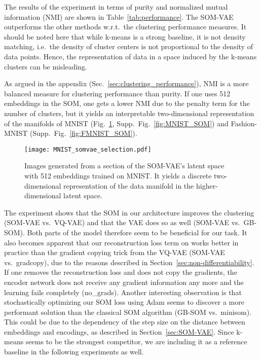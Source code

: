 \documentclass{article}
\begin{document}
The results of the experiment in terms of purity and normalized mutual information (NMI) are shown in Table~\ref{tab:performance}.
The SOM-VAE outperforms the other methods w.r.t.\ the clustering performance measures.
It should be noted here that while k-means is a strong baseline, it is not density matching, i.e.\ the density of cluster centers is not proportional to the density of data points.
Hence, the representation of data in a space induced by the k-means clusters can be misleading.

As argued in the appendix (Sec.~\ref{sec:clustering_performance}), NMI is a more balanced measure for clustering performance than purity.
If one uses 512 embeddings in the SOM, one gets a lower NMI due to the penalty term for the number of clusters, but it yields an interpretable two-dimensional representation of the manifolds of MNIST (Fig.~\ref{fig:MNIST_SOM_selection}, Supp.~Fig.~\ref{fig:MNIST_SOM}) and Fashion-MNIST (Supp.\ Fig.~\ref{fig:FMNIST_SOM}).

\begin{figure}
    \centering
    \texttt{[image: MNIST\_somvae\_selection.pdf]}
    \caption{Images generated from a section of the SOM-VAE's latent space with 512 embeddings trained on MNIST. It yields a discrete two-dimensional representation of the data manifold in the higher-dimensional latent space.}
    \label{fig:MNIST_SOM_selection}
\end{figure}

The experiment shows that the SOM in our architecture improves the clustering (SOM-VAE vs.\ VQ-VAE) and that the VAE does so as well (SOM-VAE vs.\ GB-SOM).
Both parts of the model therefore seem to be beneficial for our task.
It also becomes apparent that our reconstruction loss term on  works better in practice than the gradient copying trick from the VQ-VAE (SOM-VAE vs.\ gradcopy), due to the reasons described in Section~\ref{sec:non-differentiability}.
If one removes the  reconstruction loss and does not copy the gradients, the encoder network does not receive any gradient information any more and the learning fails completely (no\_grads).
Another interesting observation is that stochastically optimizing our SOM loss using Adam \citep{Kingma2015} seems to discover a more performant solution than the classical SOM algorithm (GB-SOM vs.\ minisom).
This could be due to the dependency of the step size on the distance between embeddings and encodings, as described in Section~\ref{sec:SOM-VAE}.
Since k-means seems to be the strongest competitor, we are including it as a reference baseline in the following experiments as well.
\end{document}
